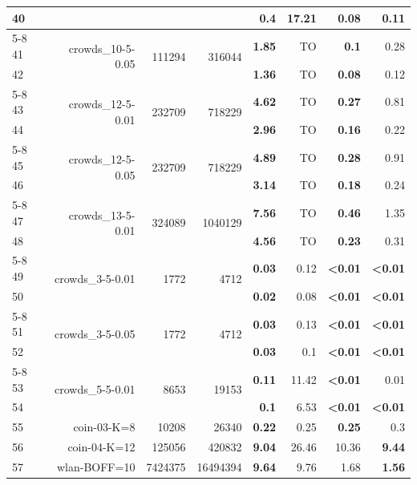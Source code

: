 \begin{longtable}{lrr@{\hskip 12pt}r@{\hskip 12pt}r@{\hskip 12pt}r@{\hskip 12pt}r@{\hskip 12pt}r}
40 &  &  &  & \textbf{0.4} & 17.21 & \textbf{0.08} & 0.11 \\
\cmidrule{5-8}
41 & \multirow{2}{*}{crowds\_10-5-0.05} & \multirow{2}{*}{111294} & \multirow{2}{*}{316044} & \textbf{1.85} & TO & \textbf{0.1} & 0.28 \\
42 &  &  &  & \textbf{1.36} & TO & \textbf{0.08} & 0.12 \\
\cmidrule{5-8}
43 & \multirow{2}{*}{crowds\_12-5-0.01} & \multirow{2}{*}{232709} & \multirow{2}{*}{718229} & \textbf{4.62} & TO & \textbf{0.27} & 0.81 \\
44 &  &  &  & \textbf{2.96} & TO & \textbf{0.16} & 0.22 \\
\cmidrule{5-8}
45 & \multirow{2}{*}{crowds\_12-5-0.05} & \multirow{2}{*}{232709} & \multirow{2}{*}{718229} & \textbf{4.89} & TO & \textbf{0.28} & 0.91 \\
46 &  &  &  & \textbf{3.14} & TO & \textbf{0.18} & 0.24 \\
\cmidrule{5-8}
47 & \multirow{2}{*}{crowds\_13-5-0.01} & \multirow{2}{*}{324089} & \multirow{2}{*}{1040129} & \textbf{7.56} & TO & \textbf{0.46} & 1.35 \\
48 &  &  &  & \textbf{4.56} & TO & \textbf{0.23} & 0.31 \\
\cmidrule{5-8}
49 & \multirow{2}{*}{crowds\_3-5-0.01} & \multirow{2}{*}{1772} & \multirow{2}{*}{4712} & \textbf{0.03} & 0.12 & \textbf{<0.01} & \textbf{<0.01} \\
50 &  &  &  & \textbf{0.02} & 0.08 & \textbf{<0.01} & \textbf{<0.01} \\
\cmidrule{5-8}
51 & \multirow{2}{*}{crowds\_3-5-0.05} & \multirow{2}{*}{1772} & \multirow{2}{*}{4712} & \textbf{0.03} & 0.13 & \textbf{<0.01} & \textbf{<0.01} \\
52 &  &  &  & \textbf{0.03} & 0.1 & \textbf{<0.01} & \textbf{<0.01} \\
\cmidrule{5-8}
53 & \multirow{2}{*}{crowds\_5-5-0.01} & \multirow{2}{*}{8653} & \multirow{2}{*}{19153} & \textbf{0.11} & 11.42 & \textbf{<0.01} & 0.01 \\
54 &  &  &  & \textbf{0.1} & 6.53 & \textbf{<0.01} & \textbf{<0.01} \\
\midrule
55 & \multirow{1}{*}{coin-03-K=8} & \multirow{1}{*}{10208} & \multirow{1}{*}{26340} & \textbf{0.22} & 0.25 & \textbf{0.25} & 0.3 \\
56 & \multirow{1}{*}{coin-04-K=12} & \multirow{1}{*}{125056} & \multirow{1}{*}{420832} & \textbf{9.04} & 26.46 & 10.36 & \textbf{9.44} \\
57 & \multirow{1}{*}{wlan-BOFF=10} & \multirow{1}{*}{7424375} & \multirow{1}{*}{16494394} & \textbf{9.64} & 9.76 & 1.68 & \textbf{1.56} \\

\end{longtable}
